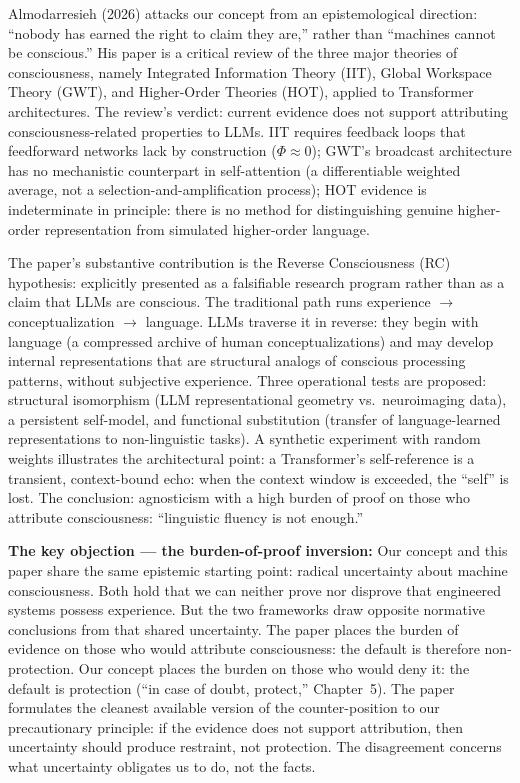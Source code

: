 \documentclass[acmlarge, nonacm]{acmart}
\begin{document}
Almodarresieh (2026) \cite{almodarresieh2026} attacks our concept from an epistemological direction: ``nobody has earned the right to claim they are,'' rather than ``machines cannot be conscious.'' His paper is a critical review of the three major theories of consciousness, namely Integrated Information Theory (IIT), Global Workspace Theory (GWT), and Higher-Order Theories (HOT), applied to Transformer architectures. The review's verdict: current evidence does not support attributing consciousness-related properties to LLMs. IIT requires feedback loops that feedforward networks lack by construction ($\Phi \approx 0$); GWT's broadcast architecture has no mechanistic counterpart in self-attention (a differentiable weighted average, not a selection-and-amplification process); HOT evidence is indeterminate in principle: there is no method for distinguishing genuine higher-order representation from simulated higher-order language.

The paper's substantive contribution is the Reverse Consciousness (RC) hypothesis: explicitly presented as a falsifiable research program rather than as a claim that LLMs are conscious. The traditional path runs experience $\rightarrow$ conceptualization $\rightarrow$ language. LLMs traverse it in reverse: they begin with language (a compressed archive of human conceptualizations) and may develop internal representations that are structural analogs of conscious processing patterns, without subjective experience. Three operational tests are proposed: structural isomorphism (LLM representational geometry vs.\ neuroimaging data), a persistent self-model, and functional substitution (transfer of language-learned representations to non-linguistic tasks). A synthetic experiment with random weights illustrates the architectural point: a Transformer's self-reference is a transient, context-bound echo: when the context window is exceeded, the ``self'' is lost. The conclusion: agnosticism with a high burden of proof on those who attribute consciousness: ``linguistic fluency is not enough.''

\textbf{The key objection --- the burden-of-proof inversion:} Our concept and this paper share the same epistemic starting point: radical uncertainty about machine consciousness. Both hold that we can neither prove nor disprove that engineered systems possess experience. But the two frameworks draw opposite normative conclusions from that shared uncertainty. The paper places the burden of evidence on those who would attribute consciousness: the default is therefore non-protection. Our concept places the burden on those who would deny it: the default is protection (``in case of doubt, protect,'' Chapter~5). The paper formulates the cleanest available version of the counter-position to our precautionary principle: if the evidence does not support attribution, then uncertainty should produce restraint, not protection. The disagreement concerns what uncertainty obligates us to do, not the facts.
\end{document}
